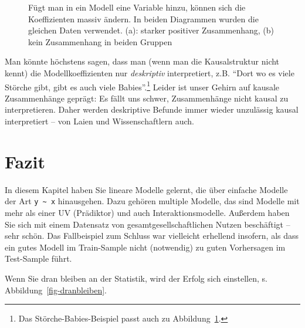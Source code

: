 \documentclass[
  letterpaper,
  oneside,
  open=any]{scrbook}
\theoremstyle{definition}
\theoremstyle{definition}
\theoremstyle{definition}
\theoremstyle{remark}
\begin{document}
\begin{figure}
\begin{minipage}{0.45\linewidth}
{}


\end{minipage}%

\caption{\label{fig-confounder}Fügt man in ein Modell eine Variable
hinzu, können sich die Koeffizienten massiv ändern. In beiden Diagrammen
wurden die gleichen Daten verwendet. (a): starker positiver
Zusammenhang, (b) kein Zusammenhang in beiden Gruppen}

\end{figure}%

Man könnte höchstens sagen, dass man (wenn man die Kausalstruktur nicht
kennt) die Modellkoeffizienten nur \emph{deskriptiv} interpretiert, z.B.
\enquote{Dort wo es viele Störche gibt, gibt es auch viele
Babies}.\footnote{Das Störche-Babies-Beispiel passt auch zu
  Abbildung~\ref{fig-confounder}.} Leider ist unser Gehirn auf kausale
Zusammenhänge geprägt: Es fällt uns schwer, Zusammenhänge nicht kausal
zu interpretieren. Daher werden deskriptive Befunde immer wieder
unzulässig kausal interpretiert -- von Laien und Wissenschaftlern auch.

\section{Fazit}\label{fazit-4}

In diesem Kapitel haben Sie lineare Modelle gelernt, die über einfache
Modelle der Art \texttt{y\ \textasciitilde{}\ x} hinausgehen. Dazu
gehören multiple Modelle, das sind Modelle mit mehr als einer UV
(Prädiktor) und auch Interaktionsmodelle. Außerdem haben Sie sich mit
einem Datensatz von gesamtgesellschaftlichen Nutzen beschäftigt -- sehr
schön. Das Fallbeispiel zum Schluss war vielleicht erhellend insofern,
als dass ein gutes Modell im Train-Sample nicht (notwendig) zu guten
Vorhersagen im Test-Sample führt.

Wenn Sie dran bleiben an der Statistik, wird der Erfolg sich einstellen,
s. Abbildung~\ref{fig-dranbleiben}.
\end{document}
